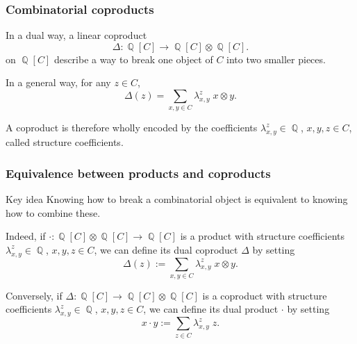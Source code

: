 \documentclass[unknownkeysallowed,10pt,xcolor={dvipsnames}]{beamer}
\DeclareMathOperator{\QQ}{\mathbb{Q}}
\begin{document}
\begin{frame} \frametitle{Combinatorial coproducts}
In a dual way, a linear coproduct
\begin{equation*}
    \Delta : \QQ[C] \to \QQ[C] \otimes \QQ[C].
\end{equation*}
on $\QQ[C]$ describe a way to \alert{break} one object of $C$ into
\alert{two smaller} pieces.
\medskip

In a general way, for any $z \in C$,
\begin{equation*}
    \Delta(z) = \sum_{x, y \in C}  \lambda_{x, y}^z \;  x \otimes y.
\end{equation*}
\medskip

A coproduct is therefore wholly encoded by the coefficients
$\lambda_{x, y}^z \in \QQ$, $x, y, z \in C$, called
\alert{structure coefficients}.
\end{frame}

\begin{frame} \frametitle{Equivalence between products and coproducts}
\begin{block}{Key idea}
    Knowing how to break a combinatorial object is equivalent
    to knowing how to combine these.
\end{block}
\medskip

Indeed, if $\cdot : \QQ[C] \otimes \QQ[C] \to \QQ[C]$ is a product with
structure coefficients $\lambda_{x, y}^z \in \QQ$, $x, y, z \in C$,
we can define its \alert{dual coproduct} $\Delta$ by setting
\begin{equation*}
    \Delta(z) := \sum_{x, y \in C}  \lambda_{x, y}^z \;  x \otimes y.
\end{equation*}
\medskip

Conversely, if $\Delta : \QQ[C] \to \QQ[C] \otimes \QQ[C]$ is
a coproduct with structure coefficients $\lambda_{x, y}^z \in \QQ$,
$x, y, z \in C$, we can define its \alert{dual product} $\cdot$ by
setting
\begin{equation*}
    x \cdot y := \sum_{z \in C} \lambda_{x, y}^z \; z.
\end{equation*}
\end{frame}
\end{document}
